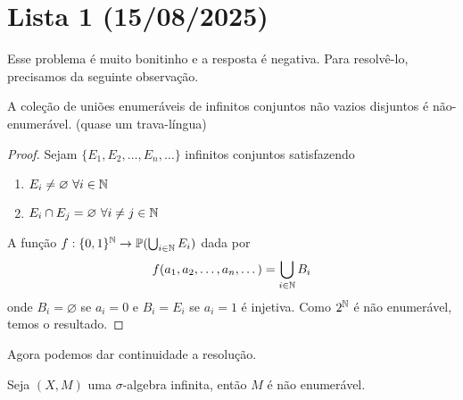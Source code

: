 \section{Lista 1 (15/08/2025)}

\prob
Esse problema é muito bonitinho e a resposta é negativa. Para resolvê-lo, precisamos da seguinte observação.
\begin{observation}
    \label{obs:1:enum}
    A coleção de uniões enumeráveis de infinitos conjuntos não vazios disjuntos é não-enumerável. (quase um trava-língua)
\end{observation}
\begin{proof}
    Sejam $\{E_1, E_2, \dots, E_n, \dots\}$ infinitos conjuntos satisfazendo
    \begin{enumerate}
        \item $E_i \neq \varnothing \ \forall i \in \mathbb{N}$ 
        \item $E_i \cap E_j = \varnothing \ \forall i \neq j \in \mathbb{N}$ 
    \end{enumerate}
    A função $f: \{0,1\}^{\mathbb{N}} \rightarrow \mathbb{P}(\bigcup_{i \in \mathbb{N}} E_i)$ dada por
    $$f(a_1, a_2, \dots, a_n, \dots) = \bigcup_{i \in \mathbb{N}} B_i$$
    onde $B_i = \varnothing$ se $a_i = 0$ e $B_i = E_i$ se $a_i = 1$ é injetiva. Como $2^{\mathbb{N}}$ é não enumerável, temos o resultado.
\end{proof}
Agora podemos dar continuidade a resolução.
\begin{prop}
    Seja $(X,M)$ uma $\sigma$-algebra infinita, então $M$ é não enumerável.
\end{prop}


